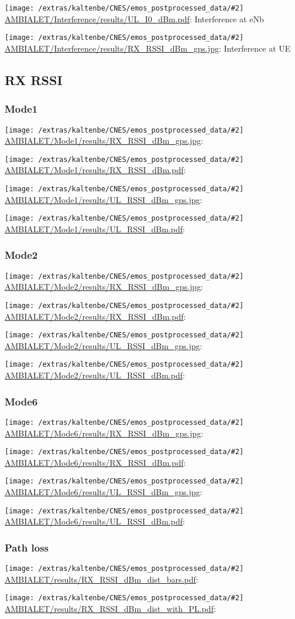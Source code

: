\documentclass[a4paper,10pt]{article}
\newcommand{\printfile}[2][]{
 \begin{minipage}{8cm}
  \centering
  \texttt{[image: /extras/kaltenbe/CNES/emos\_postprocessed\_data/\#2]}
  \url{#2}: #1

 \end{minipage}
}
\begin{document}
\printfile[Interference at eNb]{AMBIALET/Interference/results/UL_I0_dBm.pdf}
\printfile[Interference at UE]{AMBIALET/Interference/results/RX_RSSI_dBm_gps.jpg}


\subsection{RX RSSI}


% 

\subsubsection{Mode1}
\printfile{AMBIALET/Mode1/results/RX_RSSI_dBm_gps.jpg}
\printfile{AMBIALET/Mode1/results/RX_RSSI_dBm.pdf}

\printfile{AMBIALET/Mode1/results/UL_RSSI_dBm_gps.jpg}
\printfile{AMBIALET/Mode1/results/UL_RSSI_dBm.pdf}

\subsubsection{Mode2}

\printfile{AMBIALET/Mode2/results/RX_RSSI_dBm_gps.jpg}
\printfile{AMBIALET/Mode2/results/RX_RSSI_dBm.pdf}

\printfile{AMBIALET/Mode2/results/UL_RSSI_dBm_gps.jpg}
\printfile{AMBIALET/Mode2/results/UL_RSSI_dBm.pdf}

\subsubsection{Mode6}
\printfile{AMBIALET/Mode6/results/RX_RSSI_dBm_gps.jpg}
\printfile{AMBIALET/Mode6/results/RX_RSSI_dBm.pdf}

\printfile{AMBIALET/Mode6/results/UL_RSSI_dBm_gps.jpg}
\printfile{AMBIALET/Mode6/results/UL_RSSI_dBm.pdf}

\subsubsection{Path loss}

\printfile{AMBIALET/results/RX_RSSI_dBm_dist_bars.pdf}
\printfile{AMBIALET/results/RX_RSSI_dBm_dist_with_PL.pdf}
\end{document}
